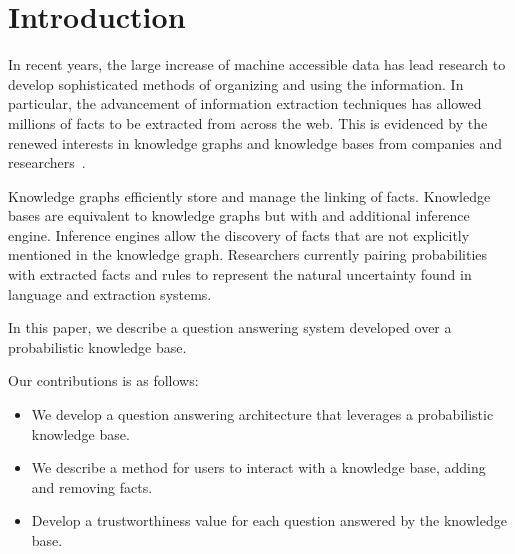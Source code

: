 

\section{Introduction}


In recent years, the large increase of machine accessible data has lead research
to develop sophisticated methods of organizing and using the information.
In particular, the advancement of information extraction techniques has allowed
millions of facts to be extracted from across the web.
This is evidenced by the renewed interests in knowledge graphs and knowledge bases
from companies and
researchers~\cite{dong2014knowledge,chang2014typed,bellare2013woo,niu2012deepdive}.

Knowledge graphs efficiently store and manage the linking of facts.
Knowledge bases are equivalent to knowledge graphs but with and additional
inference engine. 
Inference engines allow the discovery of facts that are not explicitly
mentioned in the knowledge graph.
Researchers currently pairing probabilities with extracted facts and rules to represent the natural uncertainty found in language and extraction systems.

In this paper, we describe a question answering system developed over a probabilistic 
knowledge base.

Our contributions is as follows:
\begin{itemize}
\item We develop a question answering architecture that leverages a probabilistic knowledge base.
\item We describe a method for users to interact with a knowledge base, adding and removing facts.
\item Develop a trustworthiness value for each question answered by the knowledge base.
\end{itemize}
